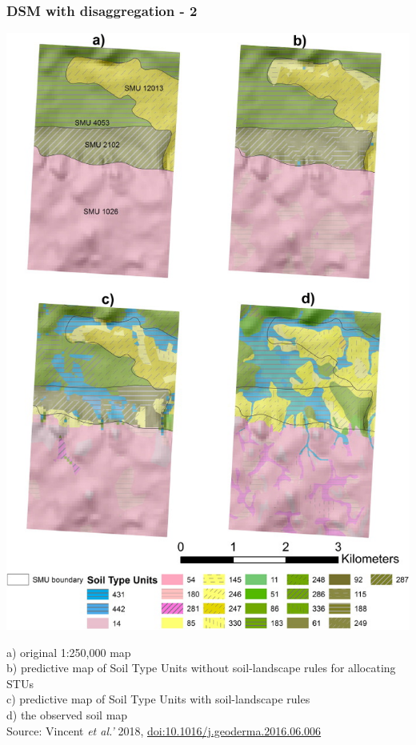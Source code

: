 \documentclass[aspectratio=169]{beamer}
\begin{document}
\begin{frame}
  \frametitle{DSM with disaggregation - 2}
  \begin{minipage}[b]{0.4\linewidth}
\includegraphics[height=0.75\textheight]{./graphics_david/1-s2.0-S0016706116302464-gr9.jpg}
   \end{minipage}
\hfill
\begin{minipage}[b]{0.58\linewidth}
  a) original 1:250,000 map\\ b) predictive map of Soil Type Units
  without soil-landscape rules for allocating STUs\\c) predictive map
  of Soil Type Units with soil-landscape rules\\d) the observed
  soil map
  \\[1ex]
  Source: Vincent \emph{et al.'} 2018, \url{doi:10.1016/j.geoderma.2016.06.006}
\end{minipage}
\end{frame}
\end{document}
